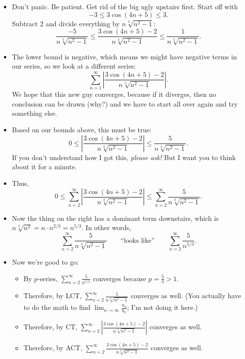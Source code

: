 \documentclass[11pt]{article}
\begin{document}
\begin{itemize}
  \item Don't panic. Be patient. Get rid of the big ugly upstairs first.
  Start off with \[
    -3 \leq 3\cos(4n+5) \leq 3.
  \]
  Subtract $2$ and divide everything by $n \sqrt[3]{n^2-1}$: \[
    \frac{-5}{n\sqrt[3]{n^2-1}} \leq \frac{3\cos(4n+5)-2}{n\sqrt[3]{n^2-1}} \leq
    \frac1{n\sqrt[3]{n^2-1}}.
  \]

  \item The lower bound is negative, which means we might have negative terms in
  our series, so we look at a different series: \[
    \sum_{n=1}^\infty\left|\frac{3\cos(4n+5)-2}{n\sqrt[3]{n^2-1}}\right|.
  \]
  \color{gray}We hope that this new guy converges, because if it diverges, then
  no conclusion can be drawn (why?) and we have to start all over again and try
  something else.\color{black}

  \item Based on our bounds above, this must be true: \[
    0 \leq \left|\frac{3\cos(4n+5)-2}{n\sqrt[3]{n^2-1}}\right| \leq
    \frac5{n\sqrt[3]{n^2-1}}.
  \]
  If you don't understand how I got this, \emph{please ask!} But I want you
  to think about it for a minute. 
  
  \item Thus, \[
    0 \leq \sum_{n=2}^\infty \left|\frac{3\cos(4n+5)-2}{n\sqrt[3]{n^2-1}}\right| \leq
    \sum_{n=2}^\infty\frac5{n\sqrt[3]{n^2-1}}.
  \]

  \item Now the thing on the right has a dominant term downstairs, which is
  $n\sqrt[3]{n^2} = n\cdot n^{2/3}=n^{5/3}$. In other words, \[
    \sum_{n=2}^\infty\frac5{n\sqrt[3]{n^2-1}} \qquad\text{``looks like''}\qquad
    \sum_{n=2}^\infty\frac5{n^{5/3}}.
  \]

  \item Now we're good to go:\begin{itemize}

    \item By $p$-series, $\displaystyle \sum_{n=2}^\infty \frac5{n^{5/3}}$
    converges because $p=\displaystyle\frac53>1$.

    \item Therefore, by LCT, $\displaystyle\sum_{n=2}^\infty\frac5{n\sqrt[3]{n^2-1}}$
    converges as well. (You actually have to do the math to find
    $\displaystyle\lim_{n\to\infty}\frac{a_n}{b_n}$; I'm not doing it here.)

    \item Therefore, by CT, $\displaystyle\sum_{n=2}^\infty
    \left|\frac{3\cos(4n+5)-2}{n\sqrt[3]{n^2-1}}\right|$ converges as well.

    \item Therefore, by ACT, $\displaystyle\sum_{n=2}^\infty
    \frac{3\cos(4n+5)-2}{n\sqrt[3]{n^2-1}}$ converges as well.

  \end{itemize}
\end{itemize}
\end{document}
